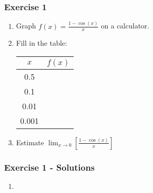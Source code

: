 \documentclass[12pt]{beamer}
\begin{document}
\begin{frame}
	\frametitle{Exercise 1}
	\initclock
	\large
	\begin{enumerate}
		\item Graph $f(x) = \frac{1-\cos(x)}{x}$ on a calculator.
		      \vspace*{\fill}
		      \vspace*{\fill}
		\item Fill in the table:
		      \small
		      \begin{table}[]
			      \begin{tabular}{c|c}
				      $x$     & $f(x)$ \\ \hline
				      0.5   &        \\
				      0.1   &        \\
				      0.01  &        \\
				      0.001 &
			      \end{tabular}
		      \end{table}
		      \large
		      \vspace*{\fill}
		      \vspace*{\fill}
		\item Estimate $\displaystyle\lim_{x\to 0}\left[\frac{1-\cos(x)}{x}\right]$
	\end{enumerate}
	\vspace*{\fill}
	\vspace*{\fill}
	\vspace*{\fill}
	\vspace*{\fill}
	\crono
\end{frame}
\begin{frame}
	\frametitle{Exercise 1 - Solutions}
	\vspace*{\fill}
	\vspace*{\fill}
	\begin{enumerate}
		\item \begin{center}

		      \end{center}
	\end{enumerate}
	\vspace*{\fill}
	\vspace*{\fill}
	\vspace*{\fill}
	\vspace*{\fill}
\end{frame}
\end{document}
